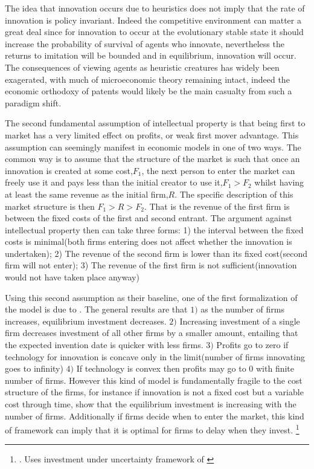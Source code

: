 \documentclass[12pt]{article}
\numberwithin{equation}{section}
\begin{document}
The idea that innovation occurs due to heuristics does not imply that the rate of innovation is policy invariant. Indeed the competitive environment can matter a great deal since for innovation to occur at the evolutionary stable state it should increase the probability of survival of agents who innovate, nevertheless the returns to imitation will be bounded and in equilibrium, innovation will occur.\cite{Winter1993} The consequences of viewing agents as heuristic creatures has widely been exagerated, with much of microeconomic theory remaining intact, indeed the economic orthodoxy of patents would likely be the main casualty from such a paradigm shift. \cite{becker1962irrational}



The second fundamental assumption of intellectual property is that being first to market has a very limited effect on profits, or weak first mover advantage. This assumption can seemingly manifest in economic models in one of two ways. The common way is to assume that the structure of the market is such that once an innovation is created at some cost,$F_1$, the next person to enter the market can freely use it and pays less than the initial creator to use it,$F_1>F_2$ whilst having at least the same revenue as the initial firm,$R$. The specific description of this market structure is then $F_1>R>F_2$. That is the revenue of the first firm is between the fixed costs of the first and second entrant. The argument against intellectual property then can take three forms: 1) the interval between the fixed costs is minimal(both firms entering does not affect whether the innovation is undertaken); 2) The revenue of the second firm is lower than its fixed cost(second firm will not enter); 3) The revenue of the first firm is not sufficient(innovation would not have taken place anyway)

Using this second assumption as their baseline, one of the first formalization of the model is due to \cite{Loury1979}. The general results are that $1)$ as the number of firms increases, equilibrium investment decreases. $2)$ Increasing investment of a single firm decreases investment of all other firms by a smaller amount, entailing that the expected invention date is quicker with less firms. $3)$ Profits go to zero if technology for innovation is concave only in the limit(number of firms innovating goes to infinity) $4)$ If technology is convex then profits may go to 0 with finite number of firms. However this kind of model is fundamentally fragile to the cost structure of the firms, for instance if innovation is not a fixed cost but a variable cost through time, \cite{lee1980market} show that the equilibrium investment is increasing with the number of firms. Additionally if firms decide when to enter the market, this kind of framework can imply that it is optimal for firms to delay when they invest. \footnote{\cite{Weeds2002}. Uses investment under uncertainty framework of \cite{dixit1994investment}}
\end{document}
